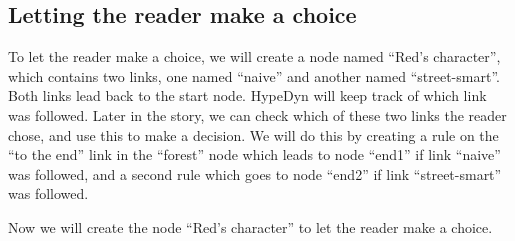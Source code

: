 \documentclass{article}
\begin{document}
\subsection{Letting the reader make a choice}

To let the reader make a choice, we will create a node named ``Red's character'',
which contains two links, one named ``naive'' and another named ``street-smart''.
Both links lead back to the start node. HypeDyn will keep track of which link was
followed. Later in the story, we can check which of these two links the reader
chose, and use this to make a decision. We will do this by creating a rule on the
``to the end'' link in the ``forest'' node which leads to node ``end1'' if link
``naive'' was followed, and a second rule which goes to node ``end2'' if link
``street-smart'' was followed.

Now we will create the node ``Red's character'' to let the reader make a
choice.
\end{document}
